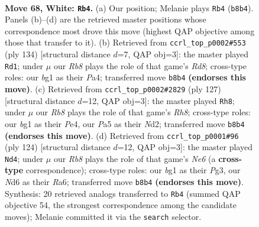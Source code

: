 \documentclass[11pt]{article}
\begin{document}
\clearpage

\begin{figure}[p]\centering
\begin{subfigure}{0.46\textwidth}\centering
\resizebox{\linewidth}{!}{%
\newchessgame
\chessboard[
  setfen={1R6/6k1/3Nn3/P7/8/7r/2K5/6b1 w - - 3 68},
  showmover=false,
  pgfstyle=straightmove, color=movearrow, markmove={b8-b4}
]}
\caption{}
\end{subfigure}\hfill
\begin{subfigure}{0.46\textwidth}\centering
\resizebox{\linewidth}{!}{%
\newchessgame
\chessboard[
  setfen={3R4/8/8/4k3/P1n5/8/7r/1K6 w - - 12 68},
  showmover=false,
  pgfstyle=straightmove, color=movearrow, markmove={d8-d1}
]}
\caption{}
\end{subfigure}
\\[4pt]
\begin{subfigure}{0.46\textwidth}\centering
\resizebox{\linewidth}{!}{%
\newchessgame
\chessboard[
  setfen={8/8/R7/6k1/4p3/4N3/3n2K1/7r b - - 9 64},
  showmover=false,
  pgfstyle=straightmove, color=movearrow, markmove={h1-h8}
]}
\caption{}
\end{subfigure}\hfill
\begin{subfigure}{0.46\textwidth}\centering
\resizebox{\linewidth}{!}{%
\newchessgame
\chessboard[
  setfen={8/4k3/R3N3/3n4/8/6P1/5r2/3K4 w - - 1 63},
  showmover=false,
  pgfstyle=straightmove, color=movearrow, markmove={e6-d4}
]}
\caption{}
\end{subfigure}
\caption{\textbf{Move 68, White: \texttt{Rb4}.} (a) Our position; Melanie plays \texttt{Rb4} (\texttt{b8b4}). Panels (b)--(d) are the retrieved master positions whose correspondence most drove this move (highest QAP objective among those that transfer to it). (b) Retrieved from \texttt{ccrl\_top\_p0002\#553} (ply 134) [structural distance $d$=7, QAP obj=3]: the master played \texttt{Rd1}; under $\mu$ our \emph{Rb8} plays the role of that game's \emph{Rd8}; cross-type roles: our \emph{b}g1 as their \emph{P}a4; transferred move \texttt{b8b4} \textbf{(endorses this move)}. (c) Retrieved from \texttt{ccrl\_top\_p0002\#2829} (ply 127) [structural distance $d$=12, QAP obj=3]: the master played \texttt{Rh8}; under $\mu$ our \emph{Rb8} plays the role of that game's \emph{Rh8}; cross-type roles: our \emph{b}g1 as their \emph{P}e4, our \emph{P}a5 as their \emph{N}d2; transferred move \texttt{b8b4} \textbf{(endorses this move)}. (d) Retrieved from \texttt{ccrl\_top\_p0001\#96} (ply 124) [structural distance $d$=12, QAP obj=3]: the master played \texttt{Nd4}; under $\mu$ our \emph{Rb8} plays the role of that game's \emph{Ne6} (a \textbf{cross-type} correspondence); cross-type roles: our \emph{b}g1 as their \emph{P}g3, our \emph{N}d6 as their \emph{R}a6; transferred move \texttt{b8b4} \textbf{(endorses this move)}. Synthesis: 20 retrieved analogs transferred to \texttt{Rb4} (summed QAP objective 54, the strongest correspondence among the candidate moves); Melanie committed it via the \texttt{search} selector.}
\label{fig:thought-m134}
\end{figure}
\end{document}
